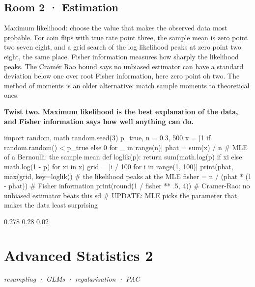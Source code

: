 \documentclass[11pt,a4paper]{report}
\begin{document}
\section*{Room 2 · Estimation}
Maximum likelihood: choose the value that makes the observed data most probable. For coin flips with true rate point three, the sample mean is zero point two seven eight, and a grid search of the log likelihood peaks at zero point two eight, the same place. Fisher information measures how sharply the likelihood peaks. The Cramér Rao bound says no unbiased estimator can have a standard deviation below one over root Fisher information, here zero point oh two. The method of moments is an older alternative: match sample moments to theoretical ones.
\begin{tcolorbox}[colback=yellow!12,colframe=orange!70!black,boxrule=0.4pt,left=4pt,right=4pt,top=2pt,bottom=2pt]\textbf{Twist two. Maximum likelihood is the best explanation of the data, and Fisher information says how well anything can do.}\end{tcolorbox}
\begin{Code}
import random, math
random.seed(3)
p_true, n = 0.3, 500
x = [1 if random.random() < p_true else 0 for _ in range(n)]
phat = sum(x) / n                           # MLE of a Bernoulli: the sample mean
def loglik(p): return sum(math.log(p) if xi else math.log(1 - p) for xi in x)
grid = [i / 100 for i in range(1, 100)]
print(phat, max(grid, key=loglik))          # the likelihood peaks at the MLE
fisher = n / (phat * (1 - phat))            # Fisher information
print(round(1 / fisher ** .5, 4))           # Cramer-Rao: no unbiased estimator beats this sd
# UPDATE: MLE picks the parameter that makes the data least surprising
\end{Code}
\begin{Out}
0.278 0.28
0.02
\end{Out}
\chapter{Advanced Statistics 2}
\textit{resampling · GLMs · regularisation · PAC}
\end{document}
